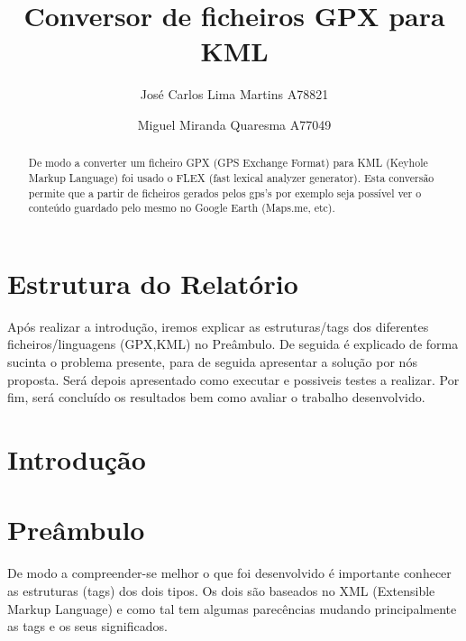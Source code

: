 \documentclass{llncs}
\begin{document}
 \mainmatter
\title{Conversor de ficheiros GPX para KML}
\author{José Carlos Lima Martins A78821 \and
        Miguel Miranda Quaresma A77049}

\maketitle

\justify

\begin{abstract}
De modo a converter um ficheiro GPX (GPS Exchange Format) para KML (Keyhole Markup Language) foi usado o FLEX (fast lexical analyzer generator). Esta conversão permite que a partir de ficheiros gerados pelos gps's por exemplo seja possível ver o conteúdo guardado pelo mesmo no Google Earth (Maps.me, etc).
\end{abstract}

\section{Estrutura do Relatório}
Após realizar a introdução, iremos explicar as estruturas/tags dos diferentes ficheiros/linguagens (GPX,KML) no Preâmbulo. De seguida é explicado de forma sucinta o problema presente, para de seguida apresentar a solução por nós proposta. Será depois apresentado como executar e possiveis testes a realizar. Por fim, será concluído os resultados bem como avaliar o trabalho desenvolvido.

\section{Introdução}

\section{Preâmbulo}\label{pb}
De modo a compreender-se melhor o que foi desenvolvido é importante conhecer as estruturas (tags) dos dois tipos. Os dois são baseados no XML (Extensible Markup Language) e como tal tem algumas parecências mudando principalmente as tags e os seus significados. 
\end{document}
